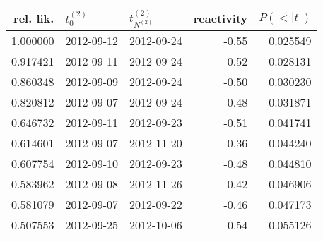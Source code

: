 \begin{tabular}{rllrr}
\toprule
 rel. lik. & $t_0^{(2)}$ & $t^{(2)}_{N^{(2)}}$ & reactivity &  $P(<|t|)$ \\
\midrule
  1.000000 &  2012-09-12 &          2012-09-24 &      -0.55 &   0.025549 \\
  0.917421 &  2012-09-11 &          2012-09-24 &      -0.52 &   0.028131 \\
  0.860348 &  2012-09-09 &          2012-09-24 &      -0.50 &   0.030230 \\
  0.820812 &  2012-09-07 &          2012-09-24 &      -0.48 &   0.031871 \\
  0.646732 &  2012-09-11 &          2012-09-23 &      -0.51 &   0.041741 \\
  0.614601 &  2012-09-07 &          2012-11-20 &      -0.36 &   0.044240 \\
  0.607754 &  2012-09-10 &          2012-09-23 &      -0.48 &   0.044810 \\
  0.583962 &  2012-09-08 &          2012-11-26 &      -0.42 &   0.046906 \\
  0.581079 &  2012-09-07 &          2012-09-22 &      -0.46 &   0.047173 \\
  0.507553 &  2012-09-25 &          2012-10-06 &       0.54 &   0.055126 \\
\bottomrule
\end{tabular}
